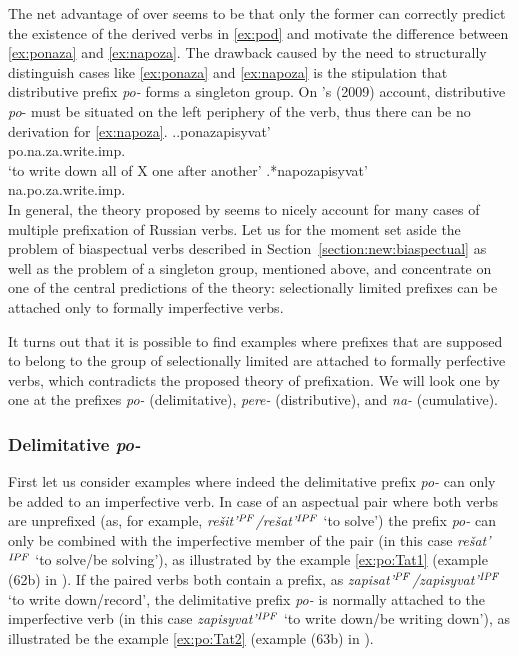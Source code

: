 The net advantage of \citet{Tatevosov:09} over \citet{Tatevosov:07} seems to be that only the former can correctly predict the existence of the derived verbs in \ref{ex:pod} and motivate the difference between \ref{ex:ponaza} and \ref{ex:napoza}. The drawback caused by the need to structurally distinguish cases like \ref{ex:ponaza} and \ref{ex:napoza} is the stipulation that distributive prefix \textit{po-} forms a singleton group. On \citeauthor{Tatevosov:09}'s (2009) account, distributive \textit{po}- must be situated on the left periphery of the verb, thus there can be no derivation for \ref{ex:napoza}.
\ex.\ag.\label{ex:ponaza}ponazapisyvat'\\
po.na.za.write.imp.\\
`to write down all of X one after another'
\bg.\label{ex:napoza}*napozapisyvat'\\
na.po.za.write.imp.\\

In general, the theory proposed by \citet{Tatevosov:09} seems to nicely account for many cases of multiple prefixation of Russian verbs. Let us for the moment set aside the problem of biaspectual verbs described in Section~\ref{section:new:biaspectual} as well as the problem of a singleton group, mentioned above, and concentrate on one of the central predictions of the theory: selectionally limited prefixes can be attached only to formally imperfective verbs.

It turns out that it is possible to find examples where prefixes that are supposed to belong to the group of selectionally limited are attached to formally perfective verbs, which contradicts the proposed theory of prefixation. We will look one by one at the prefixes \textit{po-} (delimitative), \textit{pere-} (distributive), and \textit{na-} (cumulative). 

\subsubsection{Delimitative \textit{po-}}
First let us consider examples where indeed the delimitative prefix \textit{po-} can only be added to an imperfective verb. In case of an aspectual pair where both verbs are unprefixed (as, for example, \textit{re\v{s}it'$^{\mathit{PF}}$/re\v{s}at'$^{\mathit{IPF}}$} `to solve') the prefix \textit{po-} can only be combined with the imperfective member of the pair (in this case \textit{re\v{s}at'$^{\mathit{IPF}}$} `to solve/be solving'), as illustrated by the example \ref{ex:po:Tat1} (example (62b) in \citealt[121]{Tatevosov:09}). If the paired verbs both contain a prefix, as \textit{zapisat'$^{\mathit{PF}}$/zapisyvat'$^{\mathit{IPF}}$} `to write down/record', the delimitative prefix \textit{po-} is normally attached to the imperfective verb (in this case \textit{zapisyvat'$^{\mathit{IPF}}$} `to write down/be writing down'), as illustrated be the example \ref{ex:po:Tat2} (example (63b) in \citealt[121]{Tatevosov:09}).

